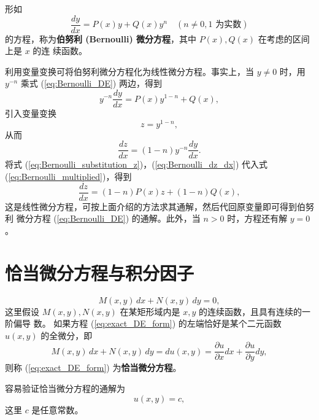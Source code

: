 \begin{example}
    形如
\begin{equation}
\frac{dy}{dx} = P(x)y+Q(x)y^n \quad (n \ne 0,1 \text{ 为实数}) \label{eq:Bernoulli_DE}
\end{equation}
的方程，称为\textbf{伯努利 (Bernoulli) 微分方程}，其中 $P(x),Q(x)$ 在考虑的区间上是 $x$ 的连
续函数。
\end{example}
\begin{solution}
    利用变量变换可将伯努利微分方程化为线性微分方程。事实上，当 $y \ne 0$ 时，用 $y^{-n}$
乘式 (\ref{eq:Bernoulli_DE}) 两边，得到
\begin{equation}
y^{-n}\frac{dy}{dx} = P(x)y^{1-n}+Q(x), \label{eq:Bernoulli_multiplied}
\end{equation}
引入变量变换
\begin{equation}
z=y^{1-n}, \label{eq:Bernoulli_substitution_z}
\end{equation}
从而
\begin{equation}
\frac{dz}{dx} = (1-n)y^{-n}\frac{dy}{dx}. \label{eq:Bernoulli_dz_dx}
\end{equation}
将式 (\ref{eq:Bernoulli_substitution_z})，(\ref{eq:Bernoulli_dz_dx}) 代入式 (\ref{eq:Bernoulli_multiplied})，得到
\begin{equation}
\frac{dz}{dx} = (1-n)P(x)z+(1-n)Q(x), \label{eq:Bernoulli_transformed_linear_DE}
\end{equation}
这是线性微分方程，可按上面介绍的方法求其通解，然后代回原变量即可得到伯努利
微分方程 (\ref{eq:Bernoulli_DE}) 的通解。此外，当 $n>0$ 时，方程还有解 $y=0$。
\end{solution}

\section{恰当微分方程与积分因子}\label{sec:恰当微分方程与积分因子}
\begin{definition}[恰当微分方程]\label{def:恰当微分方程}
\begin{equation}
M(x,y)\,dx+N(x,y)\,dy=0, \label{eq:exact_DE_form}
\end{equation}
这里假设 $M(x,y), N(x,y)$ 在某矩形域内是 $x,y$ 的连续函数，且具有连续的一阶偏导
数。
如果方程 (\ref{eq:exact_DE_form}) 的左端恰好是某个二元函数 $u(x,y)$ 的全微分，即
\begin{equation}
M(x,y)\,dx+N(x,y)\,dy = du(x,y) = \frac{\partial u}{\partial x}dx+\frac{\partial u}{\partial y}dy, \label{eq:exact_DE_condition}
\end{equation}
则称 (\ref{eq:exact_DE_form}) 为\textbf{恰当微分方程}。
\end{definition}
\begin{remark}
    容易验证恰当微分方程的通解为
\begin{equation}
u(x,y)=c, \label{eq:exact_DE_solution}
\end{equation}
这里 $c$ 是任意常数。
\end{remark}

